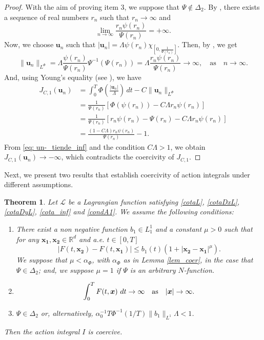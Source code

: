 \documentclass[twoside]{elsarticle}
\newtheorem{thm}{Theorem}[section]
\theoremstyle{remark}
\newcommand{\orlnor}{\|_{L^{\Phi}}}
\renewcommand{\b}[1]{\boldsymbol{#1}}
\newcommand{\rr}{\mathbb{R}}
\renewcommand{\leq}{\leqslant}
\begin{document}
\begin{proof}
With the aim of proving item 3, we suppose that $\Psi \notin \Delta_2$. 
By \cite[Thm. 4.1]{KR},  there exists a sequence of real  numbers  $r_n$ such that
$r_n \to \infty$ and 
\begin{equation}\label{eq: un-_tiende_inf}
\lim\limits_{n \to \infty} \frac{r_n \psi(r_n)}{\Psi(r_n)}=+\infty.
\end{equation}
Now, we choose $\b{u}_n$ such that
$|\b{u}_n|=\Lambda\psi(r_n)\chi_{[0,\frac{1}{\Psi(r_n)}]}$. Then, 
by \cite[Eq. (9.11)]{KR}, we get 
\[
\|\b{u}_n\orlnor =\Lambda\frac{\psi(r_n)}{\Psi(r_n)}\Psi^{-1}(\Psi(r_n))=
\Lambda\frac{r_n\psi(r_n)}{\Psi(r_n)}\to \infty,\quad\text{as}\quad n \to \infty.
\]
And, using Young's equality (see \cite[Eq. (2.7)]{KR}), we have
\[
\begin{split}
J_{C,1}(\b{u}_n)&=\int_0^T \Phi\left(\frac{|\b{u}_n|}{\Lambda}\right)\,dt-C\|\b{u}_n\orlnor\\
&=
\frac{1}{\Psi(r_n)}\left[\Phi(\psi(r_n))  -C\Lambda r_n\psi(r_n)\right]\\
&=
\frac{1}{\Psi(r_n)} \left[ r_n\psi(r_n)-\Psi(r_n)- C\Lambda r_n\psi(r_n) \right]\\
&=\frac{(1- C\Lambda) r_n\psi(r_n)}{\Psi(r_n)}-1.
\end{split}
\]
From \eqref{eq: un-_tiende_inf} and the condition $C\Lambda>1$, we obtain  $J_{C,1}(\b{u}_n)\to-\infty$, which contradicts the coercivity  of $J_{C,1}$.
\end{proof}




Next, we present two results that establish coercivity of action integrals under different assumptions. 



\begin{thm}\label{coercitividad1}
Let  $\mathcal{L}$ be a Lagrangian function satisfying \eqref{cotaL}, \eqref{cotaDxL}, \eqref{cotaDyL}, \eqref{cota_inf} and \eqref{condA1}. We assume the following conditions:
\begin{enumerate}
\item There exist a non negative function  $b_1 \in L^1_1$ and a constant $\mu>0$  such that for any $\b{x_1},\b{x_2}\in\rr^d$ and a.e. $t\in [0,T]$
\begin{equation}\label{holder_cont}
  \left| F(t,\b{x_2})- F(t,\b{x_1}) \right|\leq b_1(t)(1+|\b{x_2}-\b{x_1}|^{\mu}).
\end{equation}
We suppose that $\mu< \alpha_{\Phi}$,  with $\alpha_{\Phi}$ as in Lemma \ref{lem_coer}, in the case that $\Psi\in\Delta_2$; and, we suppose $\mu=1$  if $\Psi$ is an  arbitrary $N$-function. 
\item
\begin{equation}\label{propiedad1coercividad}
\int_{0}^{T}F(t,\b{x})\ dt \rightarrow \infty \quad \hbox{as} \quad |\b{x}|\rightarrow \infty.
\end{equation}
\item\label{hipot_coer}  $\Psi\in\Delta_2$ or, alternatively, 
$\alpha_0^{-1}T\Phi^{-1}\left(1/T\right)\|b_1\|_{L^1}\Lambda<1$.
\end{enumerate}
Then  the action integral $I$ is coercive.
\end{thm}
\end{document}
